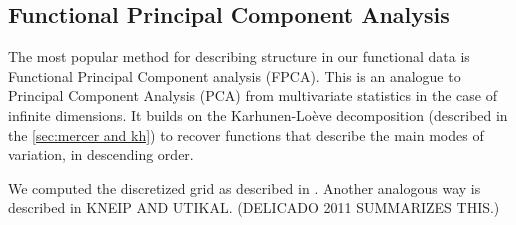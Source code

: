 \subsection{Functional Principal Component Analysis}
\label{sec:fpca}
The most popular method for describing structure in our functional data is Functional
Principal Component analysis (FPCA). This is an analogue to Principal Component Analysis
(PCA) from multivariate statistics in the case of infinite dimensions. It builds on the
Karhunen-Loève decomposition (described in the \ref{sec:mercer and kh}) to recover functions
that describe the main modes of variation, in descending order.

We computed the discretized grid as described in \citet[Chapter~8.4.1]{RamsaySilverman2005}. Another analogous way
is described in KNEIP AND UTIKAL. (DELICADO 2011 SUMMARIZES THIS.)
